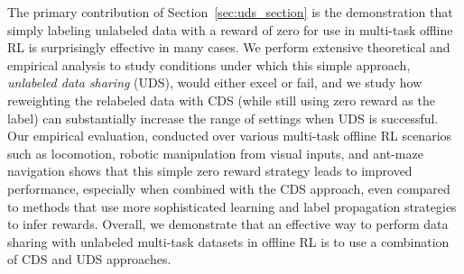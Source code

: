 \documentclass[../thesis.tex]{subfiles}
\begin{document}
The primary contribution of Section~\ref{sec:uds_section} is the demonstration that simply labeling unlabeled data with a reward of zero for use in multi-task offline RL is surprisingly effective in many cases. We perform extensive theoretical and empirical analysis to study conditions under which this simple approach, \emph{unlabeled data sharing} (UDS), would either excel or fail, and we study how reweighting the relabeled data with CDS (while still using zero reward as the label) can substantially increase the range of settings when UDS is successful. Our empirical evaluation, conducted over various multi-task offline RL scenarios such as locomotion, robotic manipulation from visual inputs, and ant-maze navigation shows that this simple zero reward strategy leads to improved performance, especially when combined with the CDS approach, even compared to methods that use more sophisticated learning and label propagation strategies to infer rewards. Overall, we demonstrate that an effective way to perform data sharing with unlabeled multi-task datasets in offline RL is to use a combination of CDS and UDS approaches.



\end{document}
